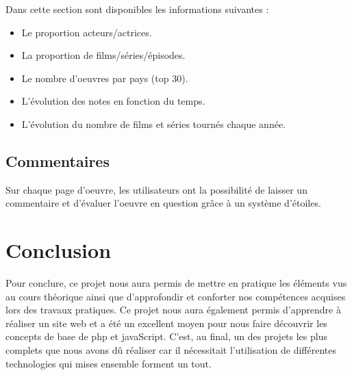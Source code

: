 \documentclass[10pt,a4paper]{article}
\begin{document}
Dans cette section sont disponibles les informations suivantes : 
\vskip 3pt
\begin{itemize}
\item Le proportion acteurs/actrices.
\item La proportion de films/séries/épisodes.
\item Le nombre d'oeuvres par pays (top 30).
\item L'évolution des notes en fonction du temps.
\item L'évolution du nombre de films et séries tournés chaque année.
\end{itemize}

\subsection{Commentaires}
Sur chaque page d'oeuvre, les utilisateurs ont la possibilité de laisser un commentaire et d'évaluer l'oeuvre en question grâce à un système d'étoiles.


\section{Conclusion}

Pour conclure, ce projet nous aura permis de mettre en pratique les éléments vus au cours théorique ainsi que d'approfondir et conforter nos compétences acquises lors des travaux pratiques. Ce projet nous aura également permis d'apprendre à réaliser un site web et a été un excellent moyen pour nous faire découvrir les concepts de base de php et javaScript. C'est, au final, un des projets les plus complets que nous avons dû réaliser car il nécessitait l'utilisation de différentes technologies qui mises ensemble forment un tout. 
\end{document}
